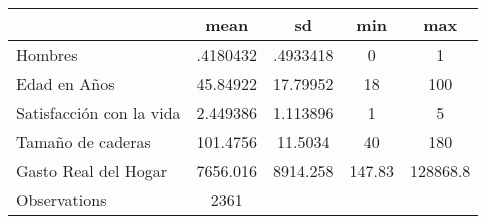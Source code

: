 {
\def\sym#1{\ifmmode^{#1}\else\(^{#1}\)\fi}
\begin{tabular}{l*{1}{cccc}}
\hline\hline
                    &        mean&          sd&         min&         max\\
\hline
Hombres             &    .4180432&    .4933418&           0&           1\\
Edad en Años        &    45.84922&    17.79952&          18&         100\\
Satisfacción con la vida&    2.449386&    1.113896&           1&           5\\
Tamaño de caderas   &    101.4756&     11.5034&          40&         180\\
Gasto Real del Hogar&    7656.016&    8914.258&      147.83&    128868.8\\
\hline
Observations        &        2361&            &            &            \\
\hline\hline
\end{tabular}
}
